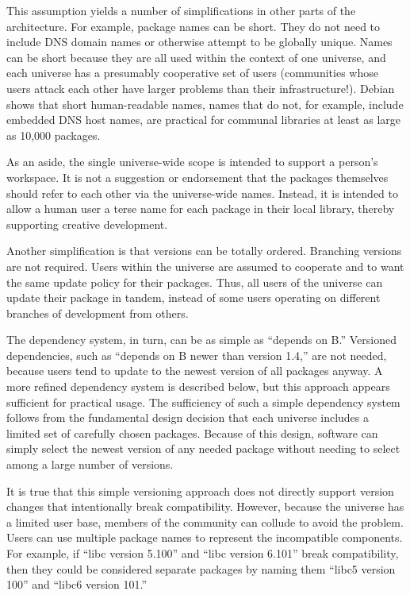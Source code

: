 \documentclass{article}
\begin{document}
This assumption yields a number of simplifications in other parts of
the architecture.  For example, package names can be short.  They do
not need to include DNS domain names or otherwise attempt to be
globally unique.
Names can be short because they are all used within the
context of one universe, and each universe has a presumably
cooperative set of users (communities whose users attack each other
have larger problems than their infrastructure!).  Debian
\cite{monga04:debian,debian:web}
shows that short human-readable names, names that do not, for example,
include embedded DNS host names, are practical for communal libraries
at least as large as 10,000 packages.

As an aside, the single universe-wide scope is intended to support a
person's workspace.  It is not a suggestion or endorsement that the
packages themselves should refer to each other via the universe-wide
names.  Instead, it is intended to allow a human user a terse name for
each package in their local library, thereby supporting creative
development.


Another simplification is that versions can be totally ordered.
Branching versions are not required.  Users within the universe are
assumed to cooperate and to want the same update policy for their
packages.  Thus, all users of the universe can update their package in
tandem, instead of some users operating on different branches of
development from others.

The dependency system, in turn, can be as simple as ``depends on B.''
Versioned dependencies, such as ``depends on B newer than version
1.4,'' are not needed, because users tend to update to the newest
version of all packages anyway.  A more refined dependency system is
described below, but this approach appears sufficient for practical
usage.  The sufficiency of such a simple dependency system follows
from the fundamental design decision that each universe includes a
limited set of carefully chosen packages.  Because of this design,
software can simply select the newest version of any needed package
without needing to select among a large number of versions.



It is true that this simple versioning approach does not directly
support version changes that intentionally break compatibility.
However, because the universe has a limited user base, members of the
community can collude to avoid the problem.  Users can use multiple
package names to represent the incompatible components.  For example,
if ``libc version 5.100'' and ``libc version 6.101'' break
compatibility, then they could be considered separate packages by
naming them ``libc5 version 100'' and ``libc6 version 101.''
\end{document}
